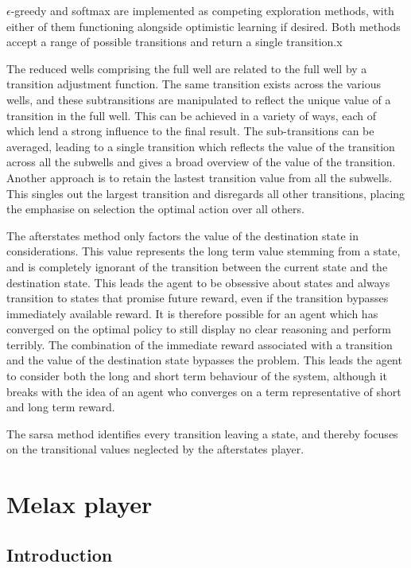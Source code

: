 \documentclass{rucsthesis}
\begin{document}
$\epsilon$-greedy and softmax are implemented as competing exploration methods, with either of them functioning alongside optimistic learning if desired. Both methods accept a range of possible transitions and return a single transition.x
 
The reduced wells comprising the full well are related to the full well by a transition adjustment function. The same transition exists across the various wells, and these subtransitions are manipulated to reflect the unique value of a transition in the full well. This can be achieved in a variety of ways, each of which lend a strong influence to the final result. The sub-transitions can be averaged, leading to a single transition which reflects the value of the transition across all the subwells and gives a broad overview of the value of the transition. Another approach is to retain the lastest transition value from all the subwells. This singles out the largest transition and disregards all other transitions, placing the emphasise on selection the optimal action over all others.

The afterstates method only factors the value of the destination state in considerations. This value represents the long term value stemming from a state, and is completely ignorant of the transition between the current state and the destination state. This leads the agent to be obsessive about states and always transition to states that promise future reward, even if the transition bypasses immediately available reward. It is therefore possible for an agent which has converged on the optimal policy to still display no clear reasoning and perform terribly. The combination of the immediate reward associated with a transition and the value of the destination state bypasses the problem. This leads the agent to consider both the long and short term behaviour of the system, although it breaks with the idea of an agent who converges on a term representative of short and long term reward.
 
The sarsa method identifies every transition leaving a state, and thereby focuses on the transitional values neglected by the afterstates player.

\chapter{Melax player}

\section{Introduction}
\end{document}
